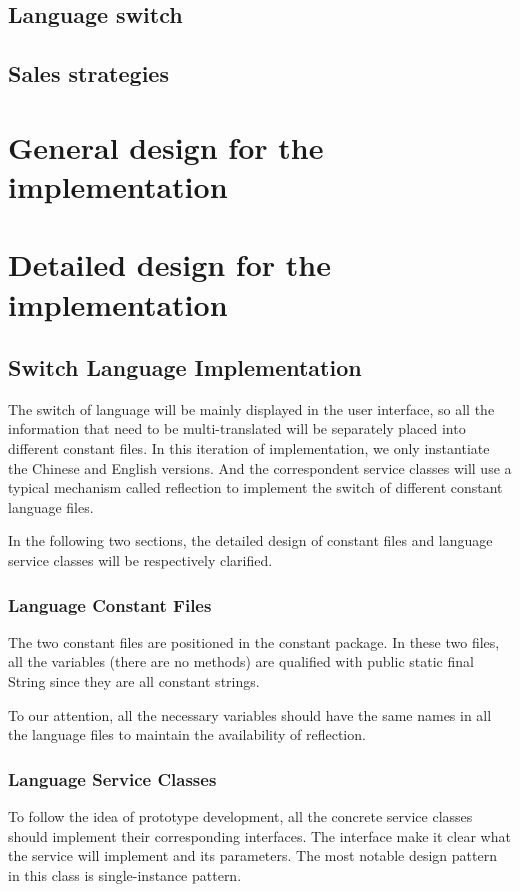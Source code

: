 \documentclass[a4paper]{report}
\begin{document}
\section{Language switch}


\section{Sales strategies}





\chapter{General design for the implementation}



\chapter{Detailed design for the implementation}

\section{Switch Language Implementation}
\par The switch of language will be mainly displayed in the user interface, so all the information that need to be multi-translated will be separately placed into  different constant files. In this iteration of implementation, we only instantiate the Chinese and English versions. And the correspondent service classes will use a typical mechanism called reflection to implement the switch of different constant language files.
\par In the following two sections, the detailed design of constant files and language service classes will be respectively clarified.
\subsection{Language Constant Files}
\par The two constant files are positioned in the constant package. In these two files, all the variables (there are no methods) are qualified with public static final String since they are all constant strings.
\par To our attention, all the necessary variables should have the same names in all the language files to maintain the availability of reflection.
\subsection{Language Service Classes }
\par To follow the idea of prototype development, all the concrete service classes should implement their corresponding interfaces. The interface make it clear what the service will implement and its parameters. The most notable design pattern in this class is single-instance pattern.
\end{document}
